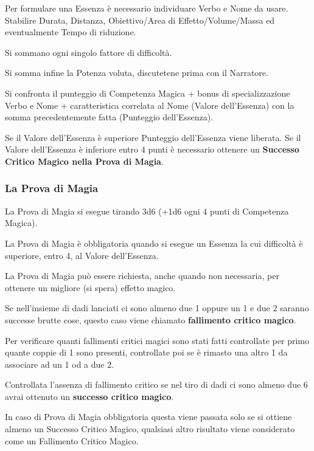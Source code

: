 \documentclass[a4paper,twoside,openany]{book}
\begin{document}
\begin{multicols}{2}
\label{riuscire-e-fallire-nella-prova-di-magia}

Per formulare una Essenza è necessario individuare Verbo e Nome da usare.
Stabilire Durata, Distanza, Obiettivo/Area di Effetto/Volume/Massa ed eventualmente Tempo di riduzione.

Si sommano ogni singolo fattore di difficoltà.

Si somma infine la Potenza voluta, discutetene prima con il Narratore.

Si confronta il punteggio di Competenza Magica + bonus di specializzazione Verbo e Nome + caratteristica correlata al Nome  (Valore dell'Essenza) con la somma precedentemente fatta (Punteggio dell'Essenza).

Se il Valore dell'Essenza è superiore Punteggio dell'Essenza viene liberata. Se il Valore dell'Essenza è inferiore entro 4 punti è necessario ottenere un \textbf{Successo Critico Magico nella Prova di Magia}.

\subsubsection{La Prova di Magia}

La Prova di Magia si esegue tirando 3d6 (+1d6 ogni 4 punti di Competenza Magica).

La Prova di Magia è obbligatoria quando si esegue un Essenza la cui difficoltà è superiore, entro 4, al Valore dell'Essenza.

La Prova di Magia può essere richiesta, anche quando non necessaria, per ottenere un migliore (si spera) effetto magico.

Se nell'insieme di dadi lanciati ci sono almeno due 1 oppure un 1 e due 2 saranno successe brutte cose, questo caso viene chiamato \textbf{fallimento critico magico}.

Per verificare quanti fallimenti critici magici sono stati fatti controllate per primo quante coppie di 1 sono presenti, controllate poi se è rimasto una altro 1 da associare ad un 1 od a due 2.

Controllata l'assenza di fallimento critico se nel tiro di dadi ci sono almeno due 6 avrai ottenuto un \textbf{successo critico magico}.

In caso di Prova di Magia obbligatoria questa viene passata solo se si ottiene almeno un Successo Critico Magico, qualsiasi altro risultato viene considerato come un Fallimento Critico Magico.


\end{multicols}
\end{document}
